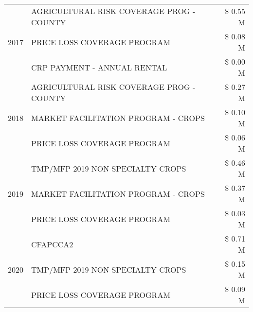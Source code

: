 \begin{tabular}{llr}
\cline{1-3}
\multirow[t]{3}{*}{2017} & AGRICULTURAL RISK COVERAGE PROG - COUNTY & \$ 0.55 M \\
 & PRICE LOSS COVERAGE PROGRAM & \$ 0.08 M \\
 & CRP PAYMENT - ANNUAL RENTAL & \$ 0.00 M \\
\cline{1-3}
\multirow[t]{3}{*}{2018} & AGRICULTURAL RISK COVERAGE PROG - COUNTY & \$ 0.27 M \\
 & MARKET FACILITATION PROGRAM - CROPS & \$ 0.10 M \\
 & PRICE LOSS COVERAGE PROGRAM & \$ 0.06 M \\
\cline{1-3}
\multirow[t]{3}{*}{2019} & TMP/MFP 2019 NON SPECIALTY CROPS & \$ 0.46 M \\
 & MARKET FACILITATION PROGRAM - CROPS & \$ 0.37 M \\
 & PRICE LOSS COVERAGE PROGRAM & \$ 0.03 M \\
\cline{1-3}
\multirow[t]{3}{*}{2020} & CFAPCCA2 & \$ 0.71 M \\
 & TMP/MFP 2019 NON SPECIALTY CROPS & \$ 0.15 M \\
 & PRICE LOSS COVERAGE PROGRAM & \$ 0.09 M \\
\cline{1-3}
\bottomrule
\end{tabular}
